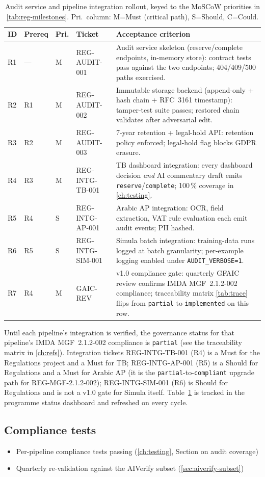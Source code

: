 \begin{table}[htbp]
\centering
\caption{Audit service and pipeline integration rollout, keyed to
the MoSCoW priorities in \cref{tab:reg-milestones}. Pri.\ column:
M=Must (critical path), S=Should, C=Could.}
\label{tab:identity-rollout}
\footnotesize
\begin{tabularx}{\linewidth}{@{}l l l l X@{}}
\toprule
\textbf{ID} & \textbf{Prereq} & \textbf{Pri.} & \textbf{Ticket} & \textbf{Acceptance criterion} \\ \midrule
R1 & ---        & M & REG-AUDIT-001   & Audit service skeleton (reserve/complete endpoints, in-memory store): contract tests pass against the two endpoints; 404/409/500 paths exercised. \\
R2 & R1         & M & REG-AUDIT-002   & Immutable storage backend (append-only + hash chain + RFC~3161 timestamp): tamper-test suite passes; restored chain validates after adversarial edit. \\
R3 & R2         & M & REG-AUDIT-003   & 7-year retention + legal-hold API: retention policy enforced; legal-hold flag blocks GDPR erasure. \\
R4 & R3         & M & REG-INTG-TB-001 & TB dashboard integration: every dashboard decision \emph{and} AI commentary draft emits \texttt{reserve}/\texttt{complete}; 100\,\% coverage in \cref{ch:testing}. \\
R5 & R4         & S & REG-INTG-AP-001 & Arabic AP integration: OCR, field extraction, VAT rule evaluation each emit audit events; PII hashed. \\
R6 & R5         & S & REG-INTG-SIM-001 & Simula batch integration: training-data runs logged at batch granularity; per-example logging enabled under \texttt{AUDIT\_VERBOSE=1}. \\
R7 & R4         & M & GAIC-REV        & v1.0 compliance gate: quarterly GFAIC review confirms IMDA MGF~2.1.2-002 compliance; traceability matrix \cref{tab:trace} flips from \texttt{partial} to \texttt{implemented} on this row. \\
\bottomrule
\end{tabularx}
\end{table}

\noindent
Until each pipeline's integration is verified, the governance status
for that pipeline's IMDA MGF~2.1.2-002 compliance is \texttt{partial}
(see the traceability matrix in \cref{ch:refs}). Integration tickets
REG-INTG-TB-001 (R4) is a Must for the Regulations project and a Must
for TB; REG-INTG-AP-001 (R5) is a Should for Regulations and a Must
for Arabic AP (it is the \texttt{partial}-to-\texttt{compliant}
upgrade path for REG-MGF-2.1.2-002); REG-INTG-SIM-001 (R6) is Should
for Regulations and is not a v1.0 gate for Simula itself.
Table~\ref{tab:identity-rollout} is tracked in the programme status
dashboard and refreshed on every cycle.

\subsection{Compliance tests}

\begin{itemize}
  \item[\texttt{[ ]}] Per-pipeline compliance tests passing
        (\cref{ch:testing}, Section on audit coverage)
  \item[\texttt{[ ]}] Quarterly re-validation against the
        AIVerify subset (\cref{sec:aiverify-subset})
\end{itemize}
